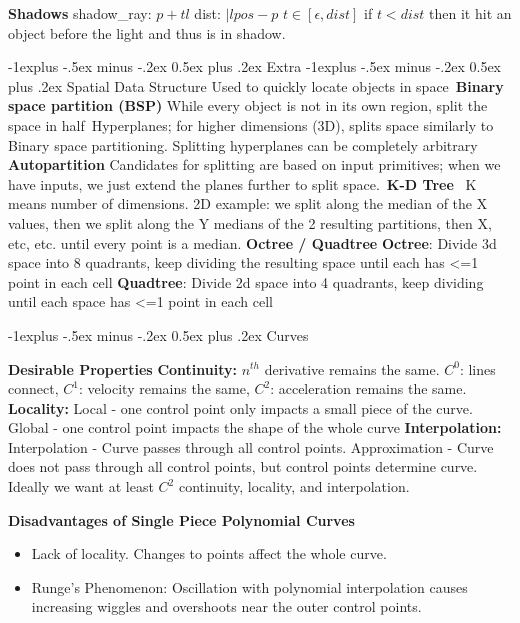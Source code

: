 \documentclass[letterpaper, 8pt]{extarticle}
\makeatletter
\renewcommand{\section}{\@startsection{section}{1}{0mm}%
                                {-1explus -.5ex minus -.2ex}%
                                {0.5ex plus .2ex}%
                                {\normalfont\small\bfseries}}
\renewcommand{\subsection}{\@startsection{subsection}{2}{0mm}%
                                {-1explus -.5ex minus -.2ex}%
                                {0.5ex plus .2ex}%
                                {\normalfont\tiny\bfseries}}
\makeatother
\begin{document}
\begin{multicols*}{4}
\textbf{Shadows}
shadow_ray: $p + t l$
dist: $|lpos - p$
$t \in [\epsilon, dist]$
if $t < dist$ then it hit an object before the light and thus is in shadow.

\section{Extra}
\subsection{Spatial Data Structure}
Used to quickly locate objects in space\
\textbf{Binary space partition (BSP)}
While every object is not in its own region, split the space in half\
Hyperplanes; for higher dimensions (3D), splits space similarly to Binary space partitioning. Splitting hyperplanes can be completely arbitrary
\textbf{Autopartition}
Candidates for splitting are based on input primitives; when we have inputs, we just extend the planes further to split space.\
\textbf{K-D Tree} \
K means number of dimensions. 2D example: we split along the median of the X values, then we split along the Y medians of the 2 resulting partitions, then X, etc, etc. until every point is a median.
\textbf{Octree / Quadtree}
\textbf{Octree}: Divide 3d space into 8 quadrants, keep dividing the resulting space until each has <=1 point in each cell
\textbf{Quadtree}: Divide 2d space into 4 quadrants, keep dividing until each space has <=1 point in each cell


\section{Curves}

\textbf{Desirable Properties}
\textbf{Continuity:} $n^{th}$ derivative remains the same. $C^0$: lines connect,
$C^1$: velocity remains the same,
$C^2$: acceleration remains the same.
\textbf{Locality:} Local - one control point only impacts a small piece of the curve.
Global - one control point impacts the shape of the whole curve
\textbf{Interpolation:} Interpolation - Curve passes through all control points.
Approximation - Curve does not pass through all control points,
but control points determine curve.
Ideally we want at least $C^2$ continuity,
locality, and interpolation.

\textbf{Disadvantages of Single Piece Polynomial Curves}
\begin{itemize}
    \item Lack of locality. Changes to points affect the whole curve.
    \item Runge's Phenomenon: Oscillation with polynomial interpolation causes increasing wiggles and overshoots near the outer control points.
\end{itemize}



\end{multicols*}
\end{document}

